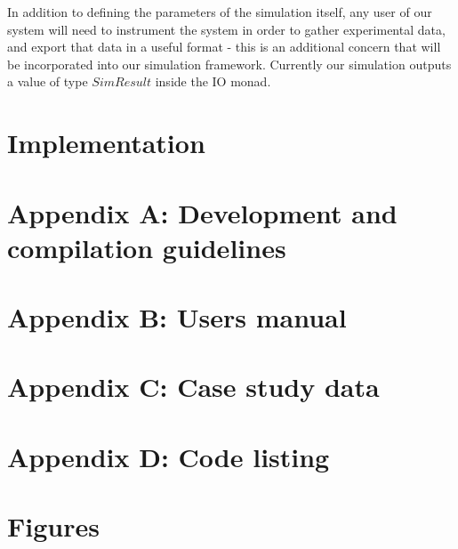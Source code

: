 \documentclass[a4paper, 11pt]{article}
\let\stdsection\section
\renewcommand\section{\newpage\stdsection}
\begin{document}
In addition to defining the parameters of the simulation itself, any user of our system will need to instrument the system in order to gather experimental data, and export that data in a useful format - this is an additional concern that will be incorporated into our simulation framework. Currently our simulation outputs a value of type $SimResult$ inside the IO monad. 








  
\section{Implementation}
\section{Appendix A: Development and compilation guidelines}
\section{Appendix B: Users manual}
\section{Appendix C: Case study data}
\section{Appendix D: Code listing}
\section{Figures}

\end{document}
